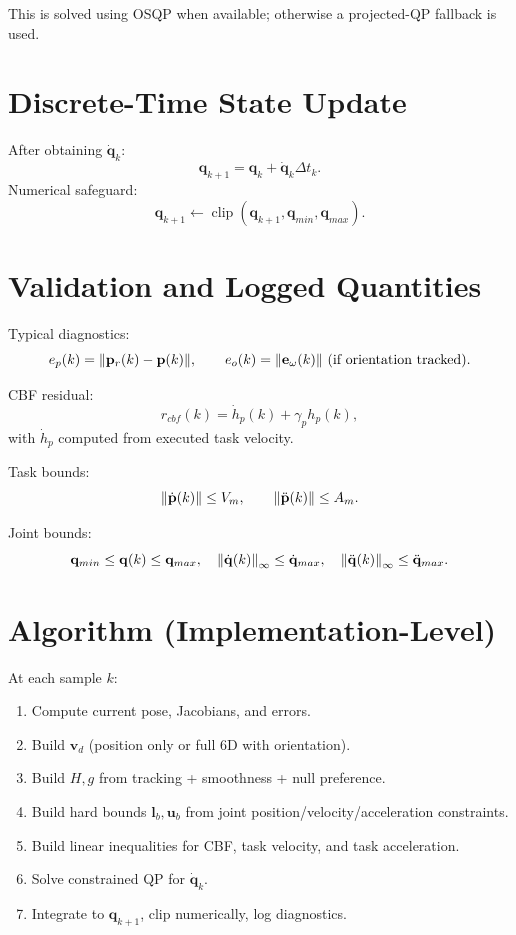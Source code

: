 \documentclass[11pt,a4paper]{article}
\begin{document}
This is solved using OSQP when available; otherwise a projected-QP fallback is used.

\section{Discrete-Time State Update}

After obtaining \(\dot{\mathbf{q}}_k\):
\[
\mathbf{q}_{k+1}=\mathbf{q}_k+\dot{\mathbf{q}}_k\Delta t_k.
\]
Numerical safeguard:
\[
\mathbf{q}_{k+1}\leftarrow
\operatorname{clip}(\mathbf{q}_{k+1},\mathbf{q}_{min},\mathbf{q}_{max}).
\]

\section{Validation and Logged Quantities}

Typical diagnostics:
\[
e_p(k)=\norm{\mathbf{p}_r(k)-\mathbf{p}(k)},
\qquad
e_o(k)=\norm{\mathbf{e}_\omega(k)}\ \text{(if orientation tracked)}.
\]

CBF residual:
\[
r_{cbf}(k)=\dot{h}_p(k)+\gamma_p h_p(k),
\]
with \(\dot{h}_p\) computed from executed task velocity.

Task bounds:
\[
\norm{\dot{\mathbf{p}}(k)}\le V_m,\qquad
\norm{\ddot{\mathbf{p}}(k)}\le A_m.
\]

Joint bounds:
\[
\mathbf{q}_{min}\le \mathbf{q}(k)\le \mathbf{q}_{max},\quad
\norm{\dot{\mathbf{q}}(k)}_\infty\le \dot{\mathbf{q}}_{max},\quad
\norm{\ddot{\mathbf{q}}(k)}_\infty\le \ddot{\mathbf{q}}_{max}.
\]

\section{Algorithm (Implementation-Level)}

At each sample \(k\):
\begin{enumerate}[label=\arabic*.]
\item Compute current pose, Jacobians, and errors.
\item Build \(\mathbf{v}_d\) (position only or full 6D with orientation).
\item Build \(H,g\) from tracking + smoothness + null preference.
\item Build hard bounds \(\mathbf{l}_b,\mathbf{u}_b\) from joint position/velocity/acceleration constraints.
\item Build linear inequalities for CBF, task velocity, and task acceleration.
\item Solve constrained QP for \(\dot{\mathbf{q}}_k\).
\item Integrate to \(\mathbf{q}_{k+1}\), clip numerically, log diagnostics.
\end{enumerate}
\end{document}
